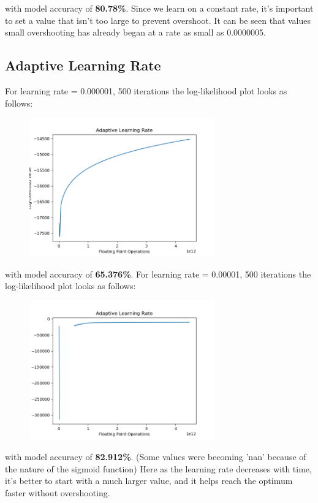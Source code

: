 \documentclass[a4paper]{article}
\begin{document}
\noindent with model accuracy of \textbf{80.78\%}.
\vskip 0.1in
\noindent Since we learn on a constant rate, it's important to set a value that isn't too large to prevent overshoot. It can be seen that values small overshooting has already began at a rate as small as 0.0000005.

\break
\subsection*{Adaptive Learning Rate}
For learning rate = 0.000001, 500 iterations the log-likelihood plot looks as follows:
\begin{figure}[h!]
\centering
\includegraphics[width=8cm,height=6cm]{adlr_000001_500_65376.png}
\end{figure}

\noindent with model accuracy of \textbf{65.376\%}.
\vskip 0.1in
\noindent For learning rate = 0.00001, 500 iterations the log-likelihood plot looks as follows:

\begin{figure}[h!]
\centering
\includegraphics[width=8cm,height=6cm]{adlr_00001_500_82192.png}
\end{figure}

\noindent with model accuracy of \textbf{82.912\%}. (Some values were becoming 'nan' because of the nature of the sigmoid function)
\vskip 0.1in
\noindent Here as the learning rate decreases with time, it's better to start with a much larger value, and it helps reach the optimum faster without overshooting.
\end{document}
